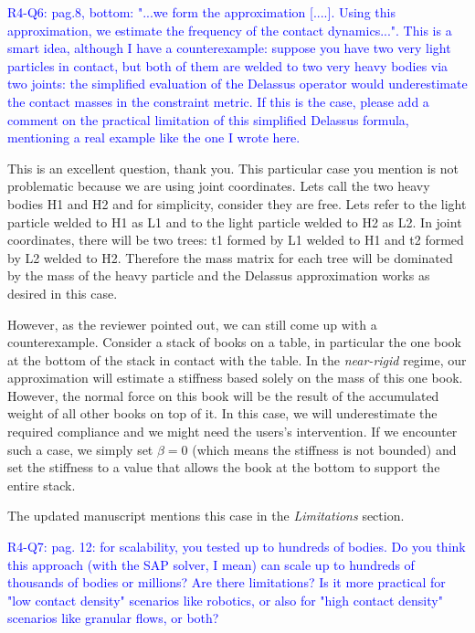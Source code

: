\vspace{5mm}

\textcolor{blue}{R4-Q6: pag.8, bottom: "...we form the approximation [....].
Using this approximation, we estimate the frequency of the contact dynamics...".
This is a smart idea, although I have a counterexample: suppose you have two
very light particles in contact, but both of them are welded to two very heavy
bodies via two joints: the simplified evaluation of the Delassus operator would
underestimate the contact masses in the constraint metric. If this is the case,
please add a comment on the practical limitation of this simplified Delassus
formula, mentioning a real example like the one I wrote here.}

This is an excellent question, thank you. This particular case you mention is
not problematic because we are using joint coordinates. Lets call the two heavy
bodies H1 and H2 and for simplicity, consider they are free. Lets refer to the
light particle welded to H1 as L1 and to the light particle welded to H2 as L2.
In joint coordinates, there will be two trees: t1 formed by L1 welded to H1 and
t2 formed by L2 welded to H2. Therefore the mass matrix for each tree will be
dominated by the mass of the heavy particle and the Delassus approximation works
as desired in this case.

However, as the reviewer pointed out, we can still come up with a
counterexample. Consider a stack of books on a table, in particular the one book
at the bottom of the stack in contact with the table. In the \emph{near-rigid}
regime, our approximation will estimate a stiffness based solely on the mass of
this one book. However, the normal force on this book will be the result of the
accumulated weight of all other books on top of it. In this case, we will
underestimate the required compliance and we might need the users's
intervention. If we encounter such a case, we simply set $\beta=0$ (which means
the stiffness is not bounded) and set the stiffness to a value that allows the
book at the bottom to support the entire stack.

The updated manuscript mentions this case in the \emph{Limitations} section.

\vspace{5mm}
\textcolor{blue}{R4-Q7: pag. 12: for scalability, you tested up to hundreds of
bodies. Do you think this approach (with the SAP solver, I mean) can scale up to
hundreds of thousands of bodies or millions? Are there limitations? Is it more
practical for "low contact density" scenarios like robotics, or also for "high
contact density" scenarios like granular flows, or both?}

